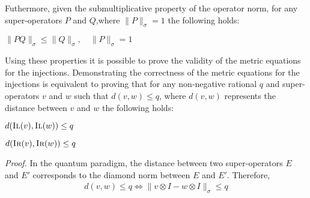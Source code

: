 Futhermore, given the submultiplicative property of the operator norm, for any super-operators $P$ and $Q$,where $\lVert P \rVert_{\sigma} =1  $ the following holds:
\begin{lemma}\label{lemleq}
  $\lVert PQ \rVert_{\sigma} \leq  \lVert Q \rVert_{\sigma}, \quad \lVert P \rVert_{\sigma}  =1 $ 
\end{lemma}

Using these properties it is possible to prove the validity of the metric equations for the injections. Demonstrating the correctness of the metric equations for the injections is equivalent to proving that for any  non‑negative rational $q$ and super-operators $v$ and $w$ such that $d(v,w) \leq q$, where  $d(v,w)$ represents the distance between $v$ and $w$ the following holds:

\begin{theorem} \label{theoremil}
  $d(\textsc{Il}(v),\textsc{Il} (w)) \leq q$
\end{theorem}
\begin{theorem} \label{theoremir}
  $d(\textsc{Ir}(v),\textsc{Ir} (w)) \leq q$
\end{theorem}
\vspace{10pt}
\textit{Proof.} \quad In the quantum paradigm, the distance between two super-operators $E$ and $E'$ corresponds to the diamond norm between $E$ and $E'$. Therefore,
\begin{equation}
\begin{split}
  d(v,w) \leq q \Leftrightarrow \lVert v \otimes I - w \otimes I \rVert_{\sigma} \leq q
\end{split}
\end{equation}

